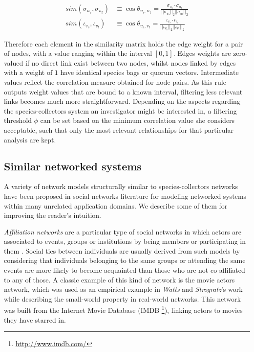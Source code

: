 \begin{equation}
\begin{split}
sim(\sigma_{u_s},\sigma_{u_t}) &\equiv
\cos \theta_{u_s,u_t} =
\frac{  \sigma_{u_s} \cdot \sigma_{u_t}  }{  ||\sigma_{u_s}||_2  ||\sigma_{u_t}||_2  } \\
sim(\iota_{v_s},\iota_{v_t}) &\equiv
\cos \theta_{v_s,v_t} =
\frac{  \iota_{v_s} \cdot \iota_{v_t}  }{  ||\iota_{v_s}||_2  ||\iota_{v_t}||_2  } 
\end{split}
\end{equation}

Therefore each element in the similarity matrix holds the edge weight for a pair of nodes, with a value ranging within the interval $[0,1]$. Edges weights are zero-valued if no direct link exist between two nodes,  whilst nodes linked by edges with a weight of $1$ have identical species bags or quorum vectors. Intermediate values reflect the correlation measure obtained for node pairs.
As this rule outputs weight values that are bound to a known interval, filtering less relevant links becomes much more straightforward. Depending on the aspects regarding the species-collectors system an investigator might be interested in, a filtering threshold $\phi$ can be set based on the minimum correlation value she considers acceptable, such that only the most relevant relationships for that particular analysis are kept.


\subsection{Similar networked systems}
A variety of network models structurally similar to species-collectors networks have been proposed in social networks literature for modeling networked systems within many unrelated application domains. We describe some of them for improving the reader's intuition.

\textit{Affiliation networks} are a particular type of social networks in which actors are associated to events, groups or institutions by being members or participating in them \cite{Borgatti2015}. Social ties between individuals are usually derived from such models by considering that individuals belonging to the same groups or attending the same events are more likely to become acquainted than those who are not co-affiliated to any of those. 
A classic example of this kind of network is the movie actors network, which was used as an empirical example in \textit{Watts} and \textit{Strogratz}'s work \cite{Watts1998} while describing the small-world property in real-world networks.
This network was built from the Internet Movie Database (IMDB \footnote{\url{http://www.imdb.com/}}), linking actors to movies they have starred in.

